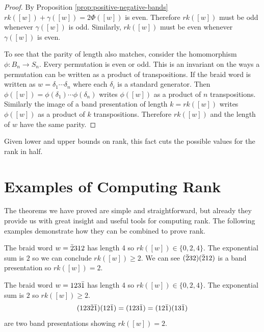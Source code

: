 \documentclass[12pt]{thesis}
\begin{document}
\begin{proof}
    By Proposition \ref{prop:positive-negative-bands}
    $rk([w]) + \gamma([w]) = 2\Phi([w])$ is even.
    Therefore $rk([w])$ must be odd whenever $\gamma([w])$ is odd.
    Similarly, $rk([w])$ must be even whenever $\gamma([w])$ is even.


    To see that the parity of length also matches,
    consider the homomorphism $\phi \colon B_{n} \rightarrow S_{n}$.
    Every permutation is even or odd.
    This is an invariant on the ways a
    permutation can be written as a product of transpositions.
    If the braid word is written as $w = \delta_{1} \cdots \delta_{n}$
    where each $\delta_{i}$ is a standard generator.
    Then $\phi([w]) = \phi(\delta_{1}) \cdots \phi(\delta_{n})$ 
    writes $\phi([w])$ as a product of $n$ transpositions.
    Similarly the image of a band presentation of length $k = rk([w])$ writes
    $\phi([w])$ as a product of $k$ transpositions.
    Therefore $rk([w])$ and the length of $w$ have the same parity.
\end{proof}

Given lower and upper bounds on rank,
this fact cuts the possible values for the rank in half.

\section{Examples of Computing Rank}

The theorems we have proved are simple and straightforward,
but already they provide us with great
insight and useful tools for computing rank.
The following examples demonstrate how they
can be combined to prove rank.

\begin{example}
    The braid word $w = \bar{2} 3 1 2$ has length 4 so $rk([w]) \in \{ 0, 2, 4 \}$.
    The exponential sum is $2$ so we can conclude $rk([w]) \geq 2$.
    We can see $(\bar{2} 3 2) (\bar{2} 1 2)$ is a band presentation so $rk([w]) = 2$.
\end{example}

\begin{example}
    The braid word $w = 1 2 3 \bar{1}$ has length 4 so $rk([w]) \in \{ 0, 2, 4 \}$.
    The exponential sum is $2$ so $rk([w]) \geq 2$.
    \[
        (1 2 3 \bar{2} \bar{1}) (1 2 \bar{1}) = (1 2 3 \bar{1}) = (1 2 \bar{1}) (1 3 \bar{1})
    \]
    are two band presentations showing $rk([w]) = 2$.
\end{example}
\end{document}
